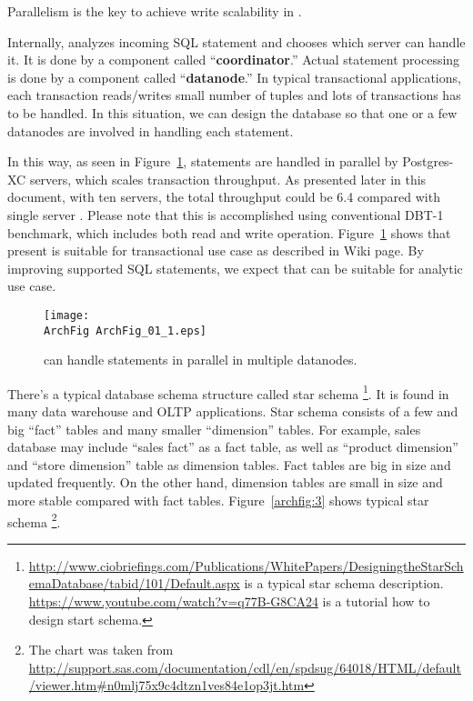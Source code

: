   Parallelism is the key to achieve write scalability in \XC.
  
  Internally, \XC{} analyzes incoming SQL statement and chooses which server can handle it.
  It is done by a component called ``\textbf{coordinator}.''
  Actual statement processing is done by a component called ``\textbf{datanode}.''
  In typical transactional applications, each transaction reads/writes
  small number of tuples and lots of transactions has to be handled.
  In this situation, we can design the database so that one
  or a few datanodes are involved in handling each statement.
  
  In this way, as seen in Figure~\ref{archfig:2},
  statements are handled in parallel by Postgres-XC servers,
  which scales transaction throughput.
  As presented later in this document, with ten servers,
  the total throughput could be 6.4 compared with single server \PG.
  Please note that this is accomplished using conventional DBT-1 benchmark,
  which includes both read and write operation.
  Figure~\ref{archfig:2}  %
  shows that present \XC{} is suitable for transactional use case
  as described in \PG{} Wiki page.
  By improving supported SQL statements,
  we expect that \XC{} can be suitable for analytic use case.

  \begin{figure}[htp]
    \begin{center}
      \texttt{[image: \\ArchFig ArchFig\_01\_1.eps]}
      \caption{\label{archfig:2}\XC{} can handle statements in parallel in multiple datanodes.}
    \end{center}
  \end{figure}


  There's a typical database schema structure called star schema%
  \footnote{
	  \url{http://www.ciobriefings.com/Publications/WhitePapers/DesigningtheStarSchemaDatabase/tabid/101/Default.aspx}
	  is a typical star schema description.
	  \url{https://www.youtube.com/watch?v=q77B-G8CA24} is a tutorial how to design start schema.
  }.
  It is found in many data warehouse and OLTP applications.
  Star schema consists of a few and big ``fact'' tables and many smaller ``dimension'' tables.
  For example, sales database may include ``sales fact'' as a fact table,
  as well as ``product dimension'' and ``store dimension'' table as dimension tables.
  Fact tables are big in size and updated frequently.
  On the other hand, dimension tables are small in size and more stable compared with fact tables.
  Figure~\ref{archfig:3} shows typical star schema%
  \footnote{The chart was taken from
	  \url{http://support.sas.com/documentation/cdl/en/spdsug/64018/HTML/default/viewer.htm#n0mlj75x9c4dtzn1ves84e1op3jt.htm}
  }.


